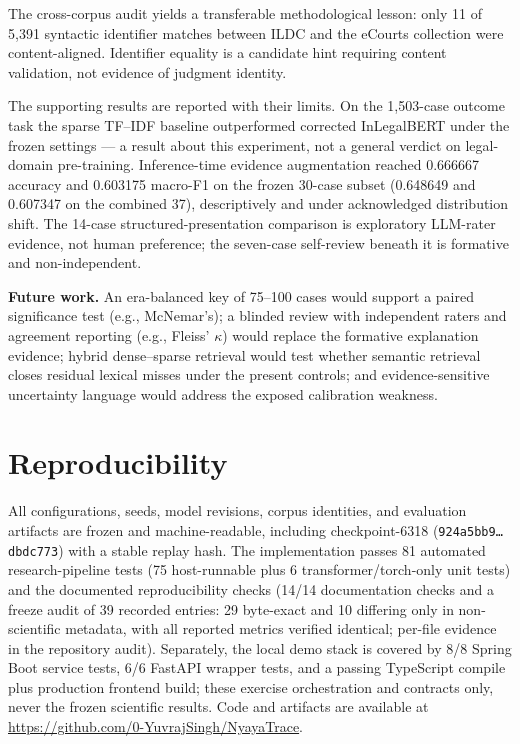 \documentclass[conference]{IEEEtran}
\begin{document}
The cross-corpus audit yields a transferable methodological lesson: only 11 of
5{,}391 syntactic identifier matches between ILDC and the eCourts collection
were content-aligned. Identifier equality is a candidate hint requiring content
validation, not evidence of judgment identity.

The supporting results are reported with their limits. On the 1{,}503-case
outcome task the sparse TF--IDF baseline outperformed corrected InLegalBERT
under the frozen settings --- a result about this experiment, not a general
verdict on legal-domain pre-training. Inference-time evidence augmentation
reached 0.666667 accuracy and 0.603175 macro-F1 on the frozen 30-case subset
(0.648649 and 0.607347 on the combined 37), descriptively and under acknowledged
distribution shift. The 14-case structured-presentation comparison is
exploratory LLM-rater evidence, not human preference; the seven-case
self-review beneath it is formative and non-independent.

\textbf{Future work.} An era-balanced key of 75--100 cases would support a
paired significance test (e.g., McNemar's); a blinded review with
independent raters and agreement reporting (e.g., Fleiss'
$\kappa$) would replace the formative explanation evidence; hybrid
dense--sparse retrieval would test whether semantic retrieval closes
residual lexical misses under the present controls; and evidence-sensitive
uncertainty language would address the exposed
calibration weakness.

\section*{Reproducibility}

All configurations, seeds, model revisions, corpus identities, and evaluation
artifacts are frozen and machine-readable, including checkpoint-6318
(\texttt{924a5bb9\ldots dbdc773}) with a stable replay hash. The implementation passes 81 automated
research-pipeline tests (75 host-runnable plus 6
transformer/torch-only unit tests) and the documented
reproducibility checks (14/14 documentation checks and a freeze audit of 39 recorded
entries: 29 byte-exact and 10 differing only in
non-scientific metadata, with all reported metrics verified identical;
per-file evidence in the repository audit). Separately, the
  local demo stack is covered by 8/8 Spring Boot service tests, 6/6 FastAPI
  wrapper tests, and a passing TypeScript compile plus production frontend
build; these exercise orchestration and contracts only, never the frozen
scientific results. Code and artifacts are available
at \url{https://github.com/0-YuvrajSingh/NyayaTrace}.
\end{document}
